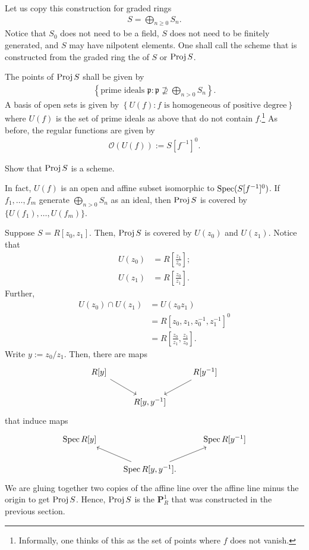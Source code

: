 \documentclass [11 pt, oneside] {article}
\begin{document}
Let us copy this construction for graded rings
\begin{align*}
	S = \bigoplus_{n\ge 0}S_n.
\end{align*}
Notice that $S_0$ does not need to be a field, $S$ does not need to be finitely generated, and $S$ may have nilpotent elements.
One shall call the scheme that is constructed from the graded ring the  of $S$ or {$\operatorname{Proj} S$}.

The points of $\operatorname{Proj} S$ shall be given by
\begin{align*}
	\left\{ \textrm{prime ideals $\mathfrak{p}$} : \mathfrak{p} \nsupseteq \bigoplus_{n>0}S_n\right\}. 
\end{align*}
A basis of open sets is given by $\left\{U(f) : \textrm{$f$ is homogeneous of positive degree}\right\}$ where $U(f)$ is the set of prime ideals as above that do not contain $f$.\footnote{Informally, one thinks of this as the set of points where $f$ does not vanish.} As before, the regular functions are given by
\begin{align*}
	\mathscr{O}(U(f)) := S[f ^{-1}]^0.
\end{align*}

\begin{exercise}\label{}\text{}
Show that $\operatorname{Proj} S$ is a scheme.
\end{exercise}

In fact, $U(f)$ is an open and affine subset isomorphic to $\operatorname{Spec}(S[f^{-1}]^0)$. If $f_1,\hdots, f_m$ generate $\bigoplus_{n>0}S_n$ as an ideal, then $\operatorname{Proj} S$ is covered by $\{U(f_1),\hdots,U(f_m)\}$. 

\begin{example}[ ]\label{}\text{}
Suppose $S=R[z_0,z_1]$. Then, $\operatorname{Proj} S$ is covered by $U(z_0)$ and $U(z_1)$. Notice that
\begin{align*}
	U(z_0) &= R\left[ \frac{z_1}{z_0} \right] ;\\
	U(z_1)&= R \left[ \frac{z_0}{z_1} \right] .
\end{align*}
Further,
\begin{align*}
	U(z_0) \cap U(z_1) &= U(z_0z_1)\\
			     &= R [z_0,z_1,z_0^{-1},z_1^{-1}]^0\\
			     &= R \left[ \frac{z_0}{z_1},\frac{z_1}{z_0} \right] .
\end{align*}
Write $y:=z_0/z_1$. Then, there are maps
\[
\begin{tikzcd}
	R[y] \ar[dr] && R[y^{-1}] \ar[dl]\\
		     &R[y,y^{-1}]
\end{tikzcd}
\]
that induce maps
\[
\begin{tikzcd}
	\Spec R[y] &&\Spec R[y^{-1}]\\
		   &\Spec R[y,y^{-1}]\ar[ur]\ar[ul].
\end{tikzcd}
\]
We are gluing together two copies of the affine line over the affine line minus the origin to get $\operatorname{Proj} S$. Hence, $\operatorname{Proj} S $ is the $\mathbf{P}^1_{R}$ that was constructed in the previous section.

\end{example}
\end{document}
